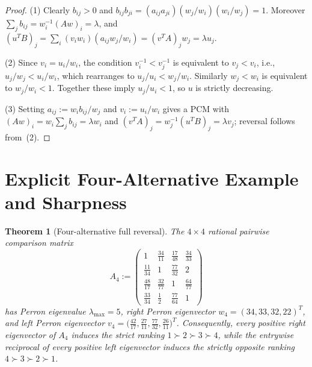\documentclass[11pt]{article}
\newtheorem{theorem}{Theorem}
\begin{document}
\begin{proof}
(1) Clearly $b_{ij} > 0$ and
$b_{ij} b_{ji} = (a_{ij} a_{ji}) (w_j / w_i) (w_i / w_j) = 1$. Moreover
$\sum_j b_{ij} = w_i^{-1} (A w)_i = \lambda$, and
$(u^T B)_j = \sum_i (v_i w_i) (a_{ij} w_j / w_i) = (v^T A)_j w_j = \lambda u_j$.

(2) Since $v_i = u_i / w_i$, the condition $v_i^{-1} < v_j^{-1}$ is equivalent
to $v_j < v_i$, i.e., $u_j / w_j < u_i / w_i$, which rearranges to
$u_j / u_i < w_j / w_i$. Similarly $w_j < w_i$ is equivalent to $w_j / w_i < 1$.
Together these imply $u_j / u_i < 1$, so $u$ is strictly decreasing.

(3) Setting $a_{ij} := w_i b_{ij} / w_j$ and $v_i := u_i / w_i$ gives a PCM
with $(A w)_i = w_i \sum_j b_{ij} = \lambda w_i$ and
$(v^T A)_j = w_j^{-1} (u^T B)_j = \lambda v_j$; reversal follows from~(2).
\end{proof}

\section{Explicit Four-Alternative Example and Sharpness}

\begin{theorem}[Four-alternative full reversal]\label{thm:four}
The $4 \times 4$ rational pairwise comparison matrix
\[
A_4 := \begin{pmatrix}
1 & \frac{34}{11} & \frac{17}{48} & \frac{34}{33} \\[3pt]
\frac{11}{34} & 1 & \frac{77}{32} & 2 \\[3pt]
\frac{48}{17} & \frac{32}{77} & 1 & \frac{64}{77} \\[3pt]
\frac{33}{34} & \frac{1}{2} & \frac{77}{64} & 1
\end{pmatrix}
\]
has Perron eigenvalue $\lambda_{\max} = 5$, right Perron eigenvector
$w_4 = (34, 33, 32, 22)^T$, and left Perron eigenvector
$v_4 = \bigl(\frac{42}{17}, \frac{27}{11}, \frac{77}{32}, \frac{26}{11}\bigr)^T$.
Consequently, every positive right eigenvector of $A_4$ induces the strict
ranking $1 \succ 2 \succ 3 \succ 4$, while the entrywise reciprocal of every
positive left eigenvector induces the strictly opposite ranking
$4 \succ 3 \succ 2 \succ 1$.
\end{theorem}
\end{document}
